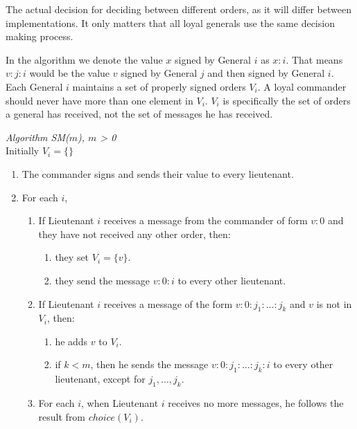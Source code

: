 \documentclass[10pt]{amsart}
\begin{document}
\noindent The actual decision for deciding between different orders, as it will differ between
implementations. It only matters that all loyal generals use the same decision making process.

In the algorithm we denote the value $x$ signed by General $i$ as $x:i$. That means $v:j:i$ would be the 
value $v$ signed by General $j$ and then signed by General $i$. Each General $i$ maintains a set of properly
signed orders $V_i$. A loyal commander should never have more than one element in $V_i$. $V_i$ is specifically
the set of orders a general has received, not the set of messages he has received.

\noindent\emph{Algorithm SM($m$), $m$ > 0} \\
Initially $V_i=\{\}$
\vspace{-10pt}
\begin{enumerate}[label=\arabic{enumi}.]
    \item The commander signs and sends their value to every lieutenant.
    \item For each $i$,
    \begin{enumerate}[label={\alph*.}]
        \item {
            If Lieutenant $i$ receives a message from the commander of form $v:0$ and they have not received
            any other order, then:
            \begin{enumerate}[label=\roman*.]
                \item they set $V_i=\{v\}$.
                \item they send the message $v:0:i$ to every other lieutenant.
            \end{enumerate}
        }
        \item {
            If Lieutenant $i$ receives a message of the form $v:0:j_1:...:j_k$ and $v$ is not in $V_i$, 
            then:
            \begin{enumerate}[label=\roman*.]
                \item he adds $v$ to $V_i$.
                \item {
                    if $k < m$, then he sends the message $v:0:j_1:...:j_k:i$ to every other lieutenant,
                    except for $j_1,...,j_k$.
                }
            \end{enumerate}
        }
        \item {
            For each $i$, when Lieutenant $i$ receives no more messages, he follows the result from 
            $choice(V_i)$.
        }
    \end{enumerate}
    
\end{enumerate}
\end{document}
